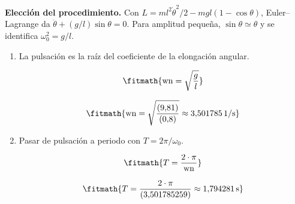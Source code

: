 \noindent\textbf{Elección del procedimiento.} Con $L=ml^2\dot\theta^2/2-mgl(1-\cos\theta)$, Euler--Lagrange da $\ddot\theta+(g/l)\sin\theta=0$. Para amplitud pequeña, $\sin\theta\simeq\theta$ y se identifica $\omega_0^2=g/l$.

\begin{enumerate}

\item La pulsación es la raíz del coeficiente de la elongación angular.

\[\fitmath{\mathrm{wn}=\sqrt{\frac{g}{l}}}\]

\[\fitmath{\mathrm{wn}=\sqrt{\frac{(9{,}81)}{(0{,}8)}}\approx 3{,}501785\,\mathrm{1/s}}\]

\item Pasar de pulsación a periodo con $T=2\pi/\omega_0$.

\[\fitmath{T=\frac{2\cdot \pi}{\mathrm{wn}}}\]

\[\fitmath{T=\frac{2\cdot \pi}{(3{,}501785259)}\approx 1{,}794281\,\mathrm{s}}\]

\end{enumerate}
